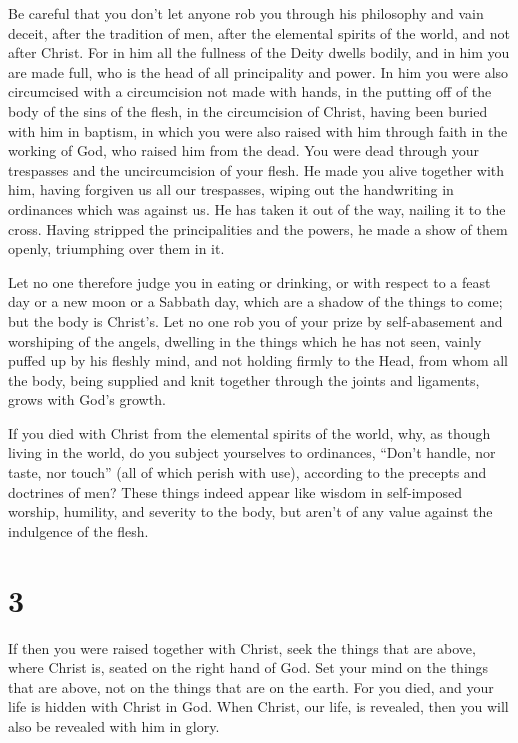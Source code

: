  Be careful that you don't let anyone rob you through his
philosophy and vain deceit, after the tradition of men, after the
elemental spirits of the world, and not after Christ.  For
in him all the fullness of the Deity dwells bodily,  and in
him you are made full, who is the head of all principality and power.
 In him you were also circumcised with a circumcision not
made with hands, in the putting off of the body of the sins of the
flesh, in the circumcision of Christ,  having been buried
with him in baptism, in which you were also raised with him through
faith in the working of God, who raised him from the dead. 
You were dead through your trespasses and the uncircumcision of your
flesh. He made you alive together with him, having forgiven us all our
trespasses,  wiping out the handwriting in ordinances which
was against us. He has taken it out of the way, nailing it to the cross.
 Having stripped the principalities and the powers, he made
a show of them openly, triumphing over them in it.

 Let no one therefore judge you in eating or drinking, or
with respect to a feast day or a new moon or a Sabbath day,
 which are a shadow of the things to come; but the body is
Christ's.  Let no one rob you of your prize by
self-abasement and worshiping of the angels, dwelling in the things
which he has not seen, vainly puffed up by his fleshly mind,
 and not holding firmly to the Head, from whom all the
body, being supplied and knit together through the joints and ligaments,
grows with God's growth.

 If you died with Christ from the elemental spirits of the
world, why, as though living in the world, do you subject yourselves to
ordinances,  ``Don't handle, nor taste, nor touch''
 (all of which perish with use), according to the precepts
and doctrines of men?  These things indeed appear like
wisdom in self-imposed worship, humility, and severity to the body, but
aren't of any value against the indulgence of the flesh.

\hypertarget{section-2}{%
\section{3}\label{section-2}}

 If then you were raised together with Christ, seek the
things that are above, where Christ is, seated on the right hand of God.
 Set your mind on the things that are above, not on the
things that are on the earth.  For you died, and your life
is hidden with Christ in God.  When Christ, our life, is
revealed, then you will also be revealed with him in glory.

